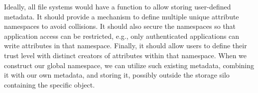
Ideally, all file systems would have a function to allow storing user-defined metadata. 
It should provide a mechanism to define multiple unique attribute namespaces to avoid collisions. 
It should also secure the namespaces so that application access can be restricted, e.g., only authenticated applications can write attributes in that namespace.
Finally, it should allow users to define their trust level with distinct creators of attributes within that namespace. 
When we construct our global namespace, we can utilize such existing metadata, combining it with our own metadata, and storing it, possibly
outside the storage silo containing the specific object.


